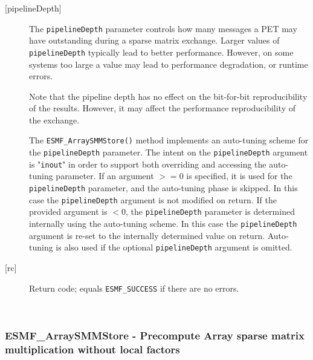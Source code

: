 \begin{description}
     \item [{[pipelineDepth]}]
       The {\tt pipelineDepth} parameter controls how many messages a PET
       may have outstanding during a sparse matrix exchange. Larger values
       of {\tt pipelineDepth} typically lead to better performance. However,
       on some systems too large a value may lead to performance degradation,
       or runtime errors.
  
       Note that the pipeline depth has no effect on the bit-for-bit
       reproducibility of the results. However, it may affect the performance
       reproducibility of the exchange.
  
       The {\tt ESMF\_ArraySMMStore()} method implements an auto-tuning scheme
       for the {\tt pipelineDepth} parameter. The intent on the 
       {\tt pipelineDepth} argument is "{\tt inout}" in order to 
       support both overriding and accessing the auto-tuning parameter.
       If an argument $>= 0$ is specified, it is used for the 
       {\tt pipelineDepth} parameter, and the auto-tuning phase is skipped.
       In this case the {\tt pipelineDepth} argument is not modified on
       return. If the provided argument is $< 0$, the {\tt pipelineDepth}
       parameter is determined internally using the auto-tuning scheme. In this
       case the {\tt pipelineDepth} argument is re-set to the internally
       determined value on return. Auto-tuning is also used if the optional 
       {\tt pipelineDepth} argument is omitted.
       
     \item [{[rc]}]
       Return code; equals {\tt ESMF\_SUCCESS} if there are no errors.
     \end{description}
   
 
\mbox{}\hrulefill\ 
 
\subsubsection [ESMF\_ArraySMMStore] {ESMF\_ArraySMMStore - Precompute Array sparse matrix multiplication without local factors}



